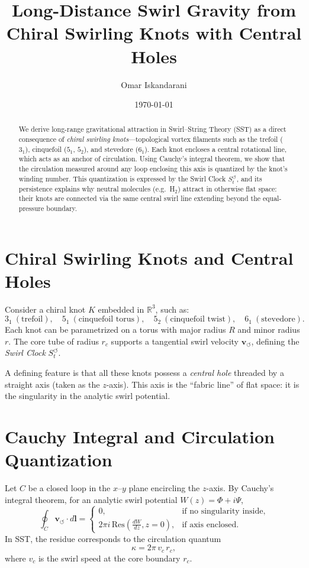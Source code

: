 \documentclass[11pt]{article}
\newcommand{\vswirl}{\mathbf{v}_{\!\boldsymbol{\circlearrowleft}}}
\newcommand{\SwirlClock}{S_t^{\boldsymbol{\circlearrowleft}}}
\begin{document}
\title{Long-Distance Swirl Gravity from Chiral Swirling Knots with Central Holes}
\author{Omar Iskandarani}
\date{\today}
\maketitle

\begin{abstract}
We derive long-range gravitational attraction in Swirl--String Theory (SST) as a direct consequence of \emph{chiral swirling knots}---topological vortex filaments such as the trefoil ($3_1$), cinquefoil ($5_1$, $5_2$), and stevedore ($6_1$).
Each knot encloses a central rotational line, which acts as an anchor of circulation.
Using Cauchy's integral theorem, we show that the circulation measured around any loop enclosing this axis is quantized by the knot's winding number.
This quantization is expressed by the Swirl Clock $\SwirlClock$, and its persistence explains why neutral molecules (e.g.\ H$_2$) attract in otherwise flat space: their knots are connected via the same central swirl line extending beyond the equal-pressure boundary.
\end{abstract}

\section{Chiral Swirling Knots and Central Holes}
Consider a chiral knot $K$ embedded in $\mathbb{R}^3$, such as:
\[
3_1 \ (\text{trefoil}), \quad
5_1 \ (\text{cinquefoil torus}), \quad
5_2 \ (\text{cinquefoil twist}), \quad
6_1 \ (\text{stevedore}).
\]
Each knot can be parametrized on a torus with major radius $R$ and minor radius $r$.
The core tube of radius $r_c$ supports a tangential swirl velocity $\vswirl$, defining the \emph{Swirl Clock} $\SwirlClock$.

A defining feature is that all these knots possess a \emph{central hole} threaded by a straight axis (taken as the $z$-axis).
This axis is the ``fabric line'' of flat space: it is the singularity in the analytic swirl potential.

\section{Cauchy Integral and Circulation Quantization}
Let $C$ be a closed loop in the $x$--$y$ plane encircling the $z$-axis.
By Cauchy's integral theorem, for an analytic swirl potential $W(z)=\Phi+i\Psi$,
\begin{equation}
\oint_C \vswirl \cdot d\mathbf{l} =
\begin{cases}
0, & \text{if no singularity inside,}\\[4pt]
2\pi i\, \mathrm{Res}\!\left(\frac{dW}{dz}, z=0\right), & \text{if axis enclosed.}
\end{cases}
\end{equation}
In SST, the residue corresponds to the circulation quantum
\begin{equation}
\kappa = 2\pi\, v_c\, r_c,
\end{equation}
where $v_c$ is the swirl speed at the core boundary $r_c$.
\end{document}
